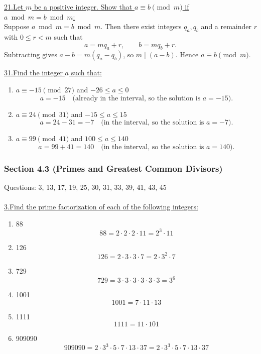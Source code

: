 \documentclass[12pt]{article}
\begin{document}
\vspace{5mm}
\noindent\underline{21.\;Let $m$ be a positive integer. Show that $a \equiv b \pmod{m}$ if $a \bmod m = b \bmod m$:}
\\\indent Suppose $a \bmod m = b \bmod m$. Then there exist integers $q_a,q_b$ and a remainder $r$ with $0\le r<m$ such that
\[
a = m q_a + r,\qquad b = m q_b + r.
\]
Subtracting gives $a-b = m(q_a-q_b)$, so $m\mid (a-b)$. Hence $a\equiv b\pmod m$.

\vspace{5mm}

\noindent\underline{31.\;Find the integer $a$ such that:}
\begin{enumerate}[label=(\alph*)]
    \item $a \equiv -15 \pmod{27}$ and $-26 \leq a \leq 0$
\[
a = -15 \quad \text{(already in the interval, so the solution is $a=-15$).}
\]

\item $a \equiv 24 \pmod{31}$ and $-15 \leq a \leq 15$
\[
a = 24 - 31 = -7 \quad \text{(in the interval, so the solution is $a=-7$).}
\]

\item $a \equiv 99 \pmod{41}$ and $100 \leq a \leq 140$
\[
a = 99 + 41 = 140 \quad \text{(in the interval, so the solution is $a=140$).}
\]

\end{enumerate}



\newpage
\subsubsection*{Section 4.3 (Primes and Greatest Common Divisors)}
Questions: 3, 13, 17, 19, 25, 30, 31, 33, 39, 41, 43, 45
\\\\

\noindent\underline{3.\;Find the prime factorization of each of the following integers:}
\begin{enumerate}[label=(\alph*)]
    \item 88
    \[
    88 = 2 \cdot 2 \cdot 2 \cdot 11 = 2^3 \cdot 11
    \]
    \item 126
    \[
    126 = 2 \cdot 3 \cdot 3 \cdot 7 = 2 \cdot 3^2 \cdot 7
    \]
    \item 729
    \[
    729 = 3 \cdot 3 \cdot 3 \cdot 3 \cdot 3 \cdot 3 = 3^6
    \]
    \item 1001
    \[
    1001 = 7 \cdot 11 \cdot 13
    \]
    \item 1111
    \[
    1111 = 11 \cdot 101
    \]
    \item 909090
    \[
    909090 = 2 \cdot 3^3 \cdot 5 \cdot 7 \cdot 13 \cdot 37 = 2 \cdot 3^3 \cdot 5 \cdot 7 \cdot 13 \cdot 37
    \]
\end{enumerate}
\end{document}
